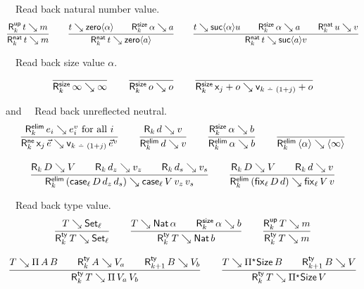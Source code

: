\documentclass[acmlarge,review,anonymous]{acmart}\settopmatter{printfolios=true}
\begin{document}
\noindent
{}\ \ Read back natural number value.
\begin{gather*}
  \ru{%
      \RUp k t m
    }{\RNat k t m}
\qquad
  \ru{t \evalsto \zero{\alpha} \qquad
      \RSize k {\alpha} a
    }{\RNat k t {\zero a}}
\qquad
  \ru{t \evalsto \suc{\alpha}u \qquad
      \RSize k {\alpha} a \qquad
      \RNat k u v
    }{\RNat k t {\suc a v}}
\end{gather*}

\noindent
{}\ \ Read back size value $\alpha$.
\begin{gather*}
  \ru{
    }{\RSize k \infty \infty}
\qquad
  \ru{
    }{\RSize k o o}
\qquad
  \ru{
    }{\RSize k {\lev j + o} {\ind{k\dotminus(1+j)} + o}}
\end{gather*}

\noindent
{} and \ \ Read back unreflected neutral.
\begin{gather*}
  \ru{%
      \RElim k {e_i} {e^v_i} \mforall i
    }{\RNe k {\lev j\,\vec e} {\ind{k \monus (1+j)}\,\vec e^v}}
\qquad
  \ru{\R k d v
    }{\RElim k d v}
\qquad
  \ru{\RSize k \alpha b
    }{\RElim k \alpha b}
\qquad
  \ru{
    }{\RElim k {\ann \alpha} {\ann \infty}}
\\[2ex]
  \ru{\R k D V \qquad
      \R k {d_z} {v_z} \qquad
      \R k {d_s} {v_s}
    }{\RElim k {(\case[\ell] D {d_z} {d_s})} {\case[\ell] V {v_z} {v_s}}}
\qquad
  \ru{\R k D V \qquad
      \R k d v
    }{\RElim k {(\fix[\ell] D d)} {\fix[\ell] V v}}
\end{gather*}

\noindent
{} \ \ Read back type value.
\begin{gather*}
  \ru{T \evalsto \Set[\ell]
    }{\RTy k T {\Set[\ell]}}
\qquad
  \ru{T \evalsto \Nat \alpha \qquad
      \RSize k \alpha b
    }{\RTy k T {\Nat b}}
\qquad
  \ru{%
      \RUp k T m
    }{\RTy k T m}
\\[2ex]
  \ru{T \evalsto \piT A B \qquad
      \RTy k A {V_a} \qquad
      \RTy {k+1} B {V_b}
    }{\RTy k T {\piT {V_a} V_b}}
\qquad
  \ru{T \evalsto \epiT \Size B \qquad
      \RTy {k+1} B {V}
    }{\RTy k T {\epiT \Size V}}
\end{gather*}
\end{document}
